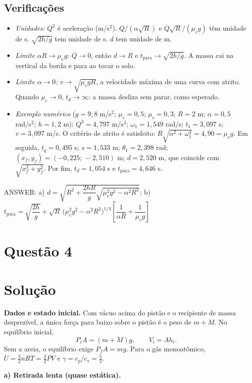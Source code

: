 \documentclass{article}%
\begin{document}
\subsection*{Verificações}
\begin{itemize}
\item \emph{Unidades:} $Q^2$ é aceleração (m/s$^2$). $Q/(\alpha\sqrt R)$ e $Q\sqrt R/(\mu_c g)$ têm unidade de s. $\sqrt{2h/g}$ tem unidade de s. $d$ tem unidade de m.
\item \emph{Limite $\alpha R\to\mu_e g$:} $Q\to0$, então $d\to R$ e $t_{\text{para}}\to\sqrt{2h/g}$. A massa cai na vertical da borda e para ao tocar o solo.
\item \emph{Limite $\alpha\to0$:} $v\to\sqrt{\mu_e gR}$, a velocidade máxima de uma curva com atrito. Quando $\mu_c\to0$, $t_d\to\infty$: a massa desliza sem parar, como esperado.
\item \emph{Exemplo numérico} ($g=9,8$ m/s$^2$; $\mu_e=0,5$; $\mu_c=0,3$; $R=2$ m; $\alpha=0,5$ rad/s$^2$; $h=1,2$ m): $Q^2=4,797$ m/s$^2$; $\omega_1=1,549$ rad/s; $t_1=3,097$ s; $v=3,097$ m/s. O critério de atrito é satisfeito: $R\sqrt{\alpha^2+\omega_1^4}=4,90=\mu_e g$. Em seguida, $t_q=0,495$ s; $s=1,533$ m; $\theta_1=2,398$ rad; $(x_f,y_f)=(-0,225;\,-2,510)$ m; $d=2,520$ m, que coincide com $\sqrt{x_f^2+y_f^2}$. Por fim, $t_d=1,054$ s e $t_{\text{para}}=4,646$ s.
\end{itemize}

ANSWER: a) $d=\sqrt{R^{2}+\dfrac{2hR}{g}\sqrt{\mu_e^{2}g^{2}-\alpha^{2}R^{2}}}$; b) $t_{\text{para}}=\sqrt{\dfrac{2h}{g}}+\sqrt{R}\,\big(\mu_e^{2}g^{2}-\alpha^{2}R^{2}\big)^{1/4}\left[\dfrac{1}{\alpha R}+\dfrac{1}{\mu_c g}\right]$%
\newpage%
\section*{Questão 4}

\section*{Solução}

\textbf{Dados e estado inicial.} Com vácuo acima do pistão e o recipiente de massa desprezível, a única força para baixo sobre o pistão é o peso de $m+M$. No equilíbrio inicial,
\[
P_iA=(m+M)g,\qquad V_i=Ah_i .
\]
Sem a areia, o equilíbrio exige $P_fA=mg$. Para o gás monoatômico, $U=\tfrac32 nRT=\tfrac32 PV$ e $\gamma=c_p/c_v=\tfrac53$.

\medskip
\textbf{a) Retirada lenta (quase estática).}
\end{document}
